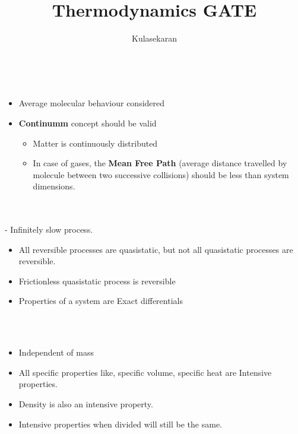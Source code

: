 \documentclass[8pt]{article}
\title{Thermodynamics GATE}\author{Kulasekaran}
\begin{document}
\maketitle
\begin{center}
\subsection*{}
\end{center} 
\\
	\begin{itemize}
		\item Average molecular behaviour considered
		\item \textbf{Continumm} concept should be valid
			\begin{itemize}
				\item Matter is continuously distributed
				\item In case of gases, the \textbf{Mean Free Path} (average distance travelled by molecule between two successive collisions) should be less than system dimensions.
			\end{itemize}
	\end{itemize}\hrulefill\\
\\ - Infinitely slow process. 
	\begin{itemize}
		\item All reversible processes are quasistatic, but not all quasistatic processes are reversible. 
		\item Frictionless quasistatic process is reversible
		\item Properties of a system are Exact differentials
	\end{itemize}
\hrulefill\\
\\
	\begin{itemize}
		\item Independent of mass
		\item All specific properties like, specific volume, specific heat are Intensive properties. 
		\item Density is also an intensive property. 
		\item Intensive properties when divided will still be the same. 
	\end{itemize}\hrulefill\\
\end{document}
